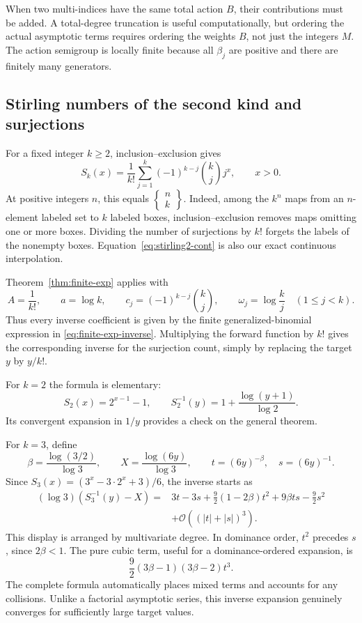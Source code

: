 \documentclass[11pt,a4paper]{article}
\numberwithin{equation}{section}
\theoremstyle{definition}
\theoremstyle{remark}
\newcommand{\bigO}{\mathcal O}
\newcommand{\StirII}[2]{\left\{\begin{matrix}#1\\#2\end{matrix}\right\}}
\begin{document}
When two multi-indices have the same total action $B$, their contributions must be added. A total-degree truncation is useful computationally, but ordering the actual asymptotic terms requires ordering the weights $B$, not just the integers $M$. The action semigroup is locally finite because all $\beta_j$ are positive and there are finitely many generators.

\subsection{Stirling numbers of the second kind and surjections}

For a fixed integer $k\ge2$, inclusion--exclusion gives
\begin{equation}
 S_k(x)=\frac1{k!}\sum_{j=1}^k(-1)^{k-j}\binom{k}{j}j^x,
 \qquad x>0.
 \label{eq:stirling2-cont}
\end{equation}
At positive integers $n$, this equals $\StirII nk$. Indeed, among the $k^n$ maps from an $n$-element labeled set to $k$ labeled boxes, inclusion--exclusion removes maps omitting one or more boxes. Dividing the number of surjections by $k!$ forgets the labels of the nonempty boxes. Equation~\eqref{eq:stirling2-cont} is also our exact continuous interpolation.

Theorem~\ref{thm:finite-exp} applies with
\begin{equation}
 A=\frac1{k!},\qquad a=\log k,\qquad
 c_j=(-1)^{k-j}\binom{k}{j},\qquad
 \omega_j=\log\frac{k}{j}\quad(1\le j<k).
 \label{eq:stirling2-params}
\end{equation}
Thus every inverse coefficient is given by the finite generalized-binomial expression in \eqref{eq:finite-exp-inverse}. Multiplying the forward function by $k!$ gives the corresponding inverse for the surjection count, simply by replacing the target $y$ by $y/k!$.

For $k=2$ the formula is elementary:
\[
 S_2(x)=2^{x-1}-1,\qquad
 S_2^{-1}(y)=1+\frac{\log(y+1)}{\log2}.
\]
Its convergent expansion in $1/y$ provides a check on the general theorem.

For $k=3$, define
\[
 \beta=\frac{\log(3/2)}{\log3},\qquad
 X=\frac{\log(6y)}{\log3},\qquad
 t=(6y)^{-\beta},\quad s=(6y)^{-1}.
\]
Since $S_3(x)=(3^x-3\cdot2^x+3)/6$, the inverse starts as
\begin{align}
 (\log3)(S_3^{-1}(y)-X)
 ={}&3t-3s+\frac92(1-2\beta)t^2+9\beta ts-\frac92s^2
 \nonumber\\
 &+\bigO((|t|+|s|)^3).
 \label{eq:stirling3-inverse}
\end{align}
This display is arranged by multivariate degree. In dominance order, $t^2$ precedes $s$, since $2\beta<1$. The pure cubic term, useful for a dominance-ordered expansion, is
\[
 \frac92(3\beta-1)(3\beta-2)t^3.
\]
The complete formula automatically places mixed terms and accounts for any collisions. Unlike a factorial asymptotic series, this inverse expansion genuinely converges for sufficiently large target values.
\end{document}
